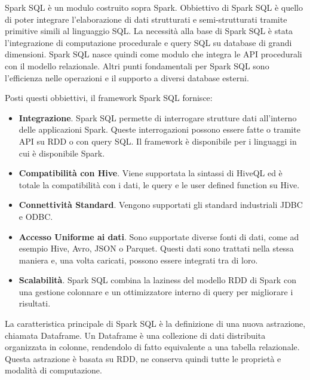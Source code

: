 Spark SQL è un modulo costruito sopra Spark.
Obbiettivo di Spark SQL è quello di poter integrare l'elaborazione di dati strutturati e semi-strutturati tramite primitive simili al linguaggio SQL.
La necessità alla base di Spark SQL è stata l'integrazione di computazione procedurale e query SQL su database di grandi dimensioni.
Spark SQL nasce quindi come modulo che integra le API procedurali con il modello relazionale.
Altri punti fondamentali per Spark SQL sono l'efficienza nelle operazioni e il supporto a diversi database esterni.

Posti questi obbiettivi, il framework Spark SQL fornisce:

\begin{itemize}
    \item \textbf{Integrazione}.
    Spark SQL permette di interrogare strutture dati all'interno delle applicazioni Spark.
    Queste interrogazioni possono essere fatte o tramite API su RDD o con query SQL.
    Il framework è disponibile per i linguaggi in cui è disponibile Spark.
    \item \textbf{Compatibilità con Hive}.
    Viene supportata la sintassi di HiveQL ed è totale la compatibilità con i dati, le query e le user defined function su Hive. 
    \item \textbf{Connettività Standard}.
    Vengono supportati gli standard industriali JDBC e ODBC.
    \item \textbf{Accesso Uniforme ai dati}.
    Sono supportate diverse fonti di dati, come ad esempio Hive, Avro, JSON o Parquet.
    Questi dati sono trattati nella stessa maniera e, una volta caricati, possono essere integrati tra di loro.
    \item \textbf{Scalabilità}.
    Spark SQL combina la laziness del modello RDD di Spark con una gestione colonnare e un ottimizzatore interno di query per migliorare i risultati.
\end{itemize}

La caratteristica principale di Spark SQL è la definizione di una nuova astrazione, chiamata Dataframe.
Un Dataframe è una collezione di dati distribuita organizzata in colonne, rendendolo di fatto equivalente a una tabella relazionale.
Questa astrazione è basata su RDD, ne conserva quindi tutte le proprietà e modalità di computazione.

